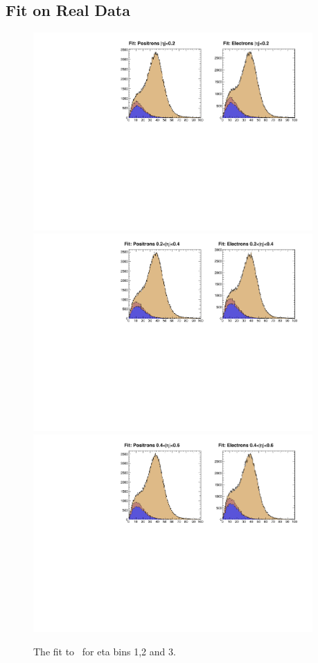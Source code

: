 \subsection{Fit on Real Data}

\begin{figure}
  \begin{center}
    \includegraphics[width=0.95\textwidth]{data_0.pdf} \\
    \includegraphics[width=0.95\textwidth]{data_1.pdf} \\
    \includegraphics[width=0.95\textwidth]{data_2.pdf}
 \caption{  \label{fig:data1} The fit to \MET\ for eta bins 1,2 and 3.}
  \end{center}
\end{figure}
